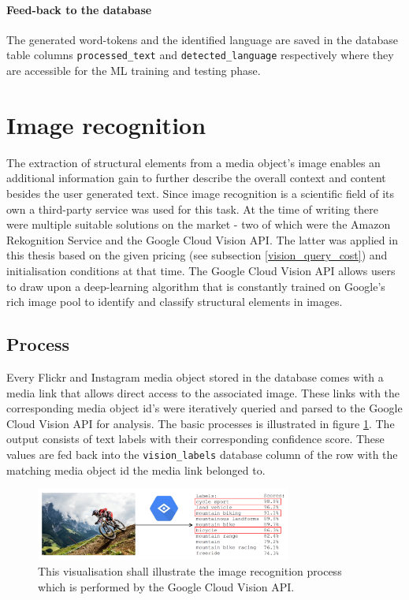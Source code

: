 \paragraph*{Feed-back to the database}
The generated word-tokens and the identified language are saved in the database table columns \texttt{processed\_text} and \texttt{detected\_language} respectively where they are accessible for the ML training and testing phase.

\section{Image recognition} \label{image_recognition}
The extraction of structural elements from a media object's image enables an additional information gain to further describe the overall context and content besides the user generated text. Since image recognition is a scientific field of its own a third-party service was used for this task. At the time of writing there were multiple suitable solutions on the market - two of which were the Amazon Rekognition Service and the Google Cloud Vision API. The latter was applied in this thesis based on the given pricing (see subsection \ref{vision_query_cost}) and initialisation conditions at that time. The Google Cloud Vision API allows users to draw upon a deep-learning algorithm that is constantly trained on Google's rich image pool to identify and classify structural elements in images.

\subsection{Process}
Every Flickr and Instagram media object stored in the database comes with a media link that allows direct access to the associated image. These links with the corresponding media object id's were iteratively queried and parsed to the Google Cloud Vision API for analysis. The basic processes is illustrated in figure \ref{fig:vision_illustration}. The output consists of text labels with their corresponding confidence score. These values are fed back into the \texttt{vision\_labels} database column of the row with the matching media object id the media link belonged to.

\begin{figure}[h!]
\centering
\includegraphics[width=0.75\textwidth]{img/vision_illustration}
\caption{This visualisation shall illustrate the image recognition process which is performed by the Google Cloud Vision API.}
\label{fig:vision_illustration}
\end{figure}

